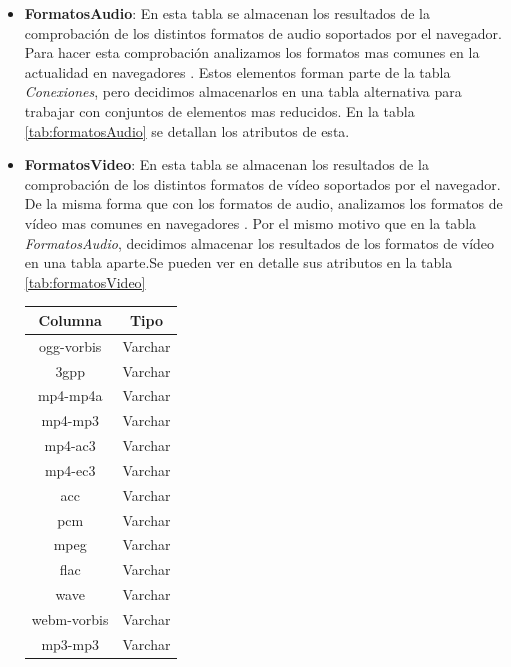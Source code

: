 \begin{itemize}
\begin{itemize}
    \end{itemize}
    \item \textbf{FormatosAudio}: En esta tabla se almacenan los resultados de la comprobación de los distintos formatos de audio soportados por el navegador. Para hacer esta comprobación analizamos los formatos mas comunes en la actualidad en navegadores \cite{Formatos}. Estos elementos forman parte de la tabla \textit{Conexiones}, pero decidimos almacenarlos en una tabla alternativa para trabajar con conjuntos de elementos mas reducidos. En la tabla \ref{tab:formatosAudio} se detallan los atributos de esta.\par
    \item \textbf{FormatosVideo}: En esta tabla se almacenan los resultados de la comprobación de los distintos formatos de vídeo soportados por el navegador. De la misma forma que con los formatos de audio, analizamos los formatos de vídeo mas comunes en navegadores \cite{Formatos}. Por el mismo motivo que en la tabla \textit{FormatosAudio}, decidimos almacenar los resultados de los formatos de vídeo en una tabla aparte.Se pueden ver en detalle sus atributos en la tabla \ref{tab:formatosVideo}\par
    \begin{table}[tbp]
    \centering
        \begin{minipage}[c]{70mm}
        \centering
            \begin{tabular}{c|c}
                \textbf{Columna} & \textbf{Tipo} \\ \hline
                ogg-vorbis & Varchar\\
                3gpp & Varchar\\
                mp4-mp4a & Varchar\\
                mp4-mp3 & Varchar\\
                mp4-ac3 & Varchar\\
                mp4-ec3 & Varchar\\
                acc & Varchar\\
                pcm & Varchar\\
                mpeg & Varchar\\
                flac & Varchar\\
                wave & Varchar\\
                webm-vorbis & Varchar\\
                mp3-mp3 & Varchar\\
            \end{tabular}

\end{minipage}
\end{table}
\end{itemize}
